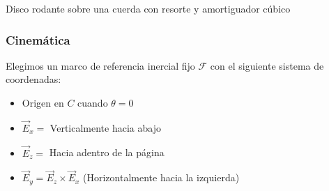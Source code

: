 \begin{solucion}{Disco rodante sobre una cuerda con resorte y amortiguador cúbico}
\subsubsection*{Cinemática}

Elegimos un marco de referencia inercial fijo $\mathcal{F}$ con el siguiente sistema de coordenadas:
\begin{itemize}
    \item Origen en $C$ cuando $\theta = 0$
    \item $\vec{E}_x =$ Verticalmente hacia abajo
    \item $\vec{E}_z =$ Hacia adentro de la página
    \item $\vec{E}_y = \vec{E}_z \times \vec{E}_x$ (Horizontalmente hacia la izquierda)
\end{itemize}


\end{solucion}
